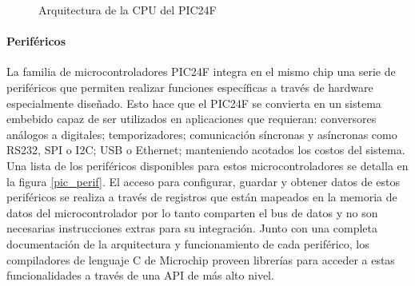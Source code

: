 \documentclass[11pt,letterpaper]{article}
\begin{document}
\begin{figure}[ht!]
\centering
{}
\caption{Arquitectura de la CPU del PIC24F}\label{pic_cpu}
\end{figure}

\paragraph{Periféricos}
La familia de microcontroladores PIC24F integra en el mismo chip una serie de periféricos que permiten realizar funciones específicas a través de hardware especialmente diseñado. Esto hace que el PIC24F se convierta en un sistema embebido capaz de ser utilizados en aplicaciones que requieran: conversores análogos a digitales; temporizadores; comunicación síncronas y asíncronas como RS232, SPI o I2C; USB o Ethernet; manteniendo acotados los costos del sistema. Una lista de los periféricos disponibles para estos microcontroladores se detalla en la figura \ref{pic_perif}. El acceso para configurar, guardar y obtener datos de estos periféricos se realiza a través de registros que están mapeados en la memoria de datos del microcontrolador por lo tanto comparten el bus de datos y no son necesarias instrucciones extras para su integración. Junto con una completa documentación de la arquitectura y funcionamiento de cada periférico, los compiladores de lenguaje C de Microchip proveen librerías para acceder a estas funcionalidades a través de una API de más alto nivel.
\end{document}
